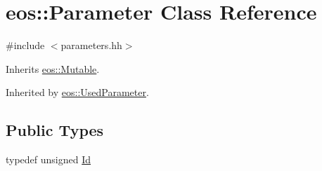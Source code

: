 \hypertarget{classeos_1_1Parameter}{
\section{eos::Parameter Class Reference}
\label{classeos_1_1Parameter}
}


{\ttfamily \#include $<$parameters.hh$>$}

Inherits \hyperlink{classeos_1_1Mutable}{eos::Mutable}.

Inherited by \hyperlink{classeos_1_1UsedParameter}{eos::UsedParameter}.\subsection*{Public Types}
\begin{DoxyCompactItemize}
\item 
typedef unsigned \hyperlink{classeos_1_1Parameter_a065f55e66b2128cc5f14339e676d833a}{Id}
\end{DoxyCompactItemize}

